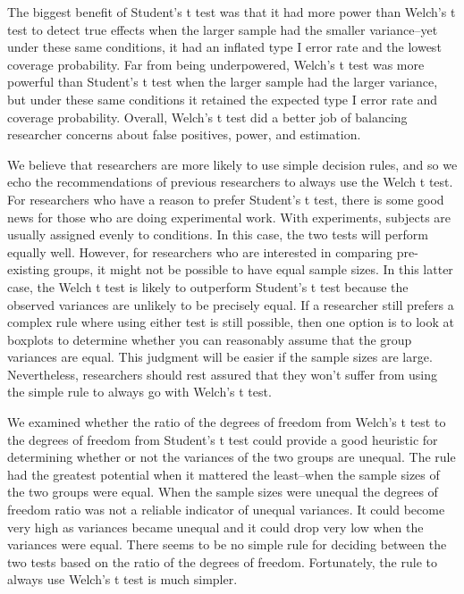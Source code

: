\documentclass[man,a4paper,noextraspace,apacite]{apa6}
\begin{document}
    The biggest benefit of Student's t test was that it had more power than Welch's t test to detect true effects when the larger sample had the smaller variance--yet under these same conditions, it had an inflated type I error rate and the lowest coverage probability. Far from being underpowered, Welch's t test was more powerful than Student's t test when the larger sample had the larger variance, but under these same conditions it retained the expected type I error rate and coverage probability. Overall, Welch's t test did a better job of balancing researcher concerns about false positives, power, and estimation.
    
    We believe that researchers are more likely to use simple decision rules, and so we echo the recommendations of previous researchers to always use the Welch t test. For researchers who have a reason to prefer Student's t test, there is some good news for those who are doing experimental work. With experiments, subjects are usually assigned evenly to conditions. In this case, the two tests will perform equally well. However, for researchers who are interested in comparing pre-existing groups, it might not be possible to have equal sample sizes. In this latter case, the Welch t test is likely to outperform Student's t test because the observed variances are unlikely to be precisely equal. If a researcher still prefers a complex rule where using either test is still possible, then one option is to look at boxplots to determine whether you can reasonably assume that the group variances are equal. This judgment will be easier if the sample sizes are large. Nevertheless, researchers should rest assured that they won't suffer from using the simple rule to always go with Welch's t test.
    
    We examined whether the ratio of the degrees of freedom from Welch's t test to the degrees of freedom from Student's t test could provide a good heuristic for determining whether or not the variances of the two groups are unequal. The rule had the greatest potential when it mattered the least--when the sample sizes of the two groups were equal. When the sample sizes were unequal the degrees of freedom ratio was not a reliable indicator of unequal variances. It could become very high as variances became unequal and it could drop very low when the variances were equal. There seems to be no simple rule for deciding between the two tests based on the ratio of the degrees of freedom. Fortunately, the rule to always use Welch's t test is much simpler.
    
\end{document}
